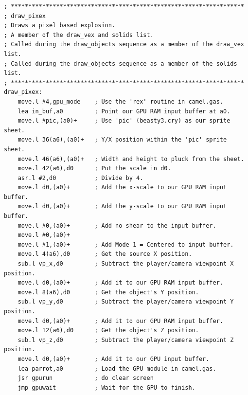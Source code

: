 \begin{lstlisting}
; *******************************************************************
; draw_pixex
; Draws a pixel based explosion.
; A member of the draw_vex and solids list.
; Called during the draw_objects sequence as a member of the draw_vex list.
; Called during the draw_objects sequence as a member of the solids list.
; *******************************************************************
draw_pixex:
    move.l #4,gpu_mode    ; Use the 'rex' routine in camel.gas.
    lea in_buf,a0         ; Point our GPU RAM input buffer at a0.
    move.l #pic,(a0)+     ; Use 'pic' (beasty3.cry) as our sprite sheet.
    move.l 36(a6),(a0)+   ; Y/X position within the 'pic' sprite sheet.
    move.l 46(a6),(a0)+   ; Width and height to pluck from the sheet.
    move.l 42(a6),d0      ; Put the scale in d0.
    asr.l #2,d0           ; Divide by 4.
    move.l d0,(a0)+       ; Add the x-scale to our GPU RAM input buffer.
    move.l d0,(a0)+       ; Add the y-scale to our GPU RAM input buffer.
    move.l #0,(a0)+       ; Add no shear to the input buffer.
    move.l #0,(a0)+
    move.l #1,(a0)+       ; Add Mode 1 = Centered to input buffer.
    move.l 4(a6),d0       ; Get the source X position.
    sub.l vp_x,d0         ; Subtract the player/camera viewpoint X position.
    move.l d0,(a0)+       ; Add it to our GPU RAM input buffer.
    move.l 8(a6),d0       ; Get the object's Y position.
    sub.l vp_y,d0         ; Subtract the player/camera viewpoint Y position.
    move.l d0,(a0)+       ; Add it to our GPU RAM input buffer.
    move.l 12(a6),d0      ; Get the object's Z position.
    sub.l vp_z,d0         ; Subtract the player/camera viewpoint Z position.
    move.l d0,(a0)+       ; Add it to our GPU input buffer.
    lea parrot,a0         ; Load the GPU module in camel.gas.
    jsr gpurun            ; do clear screen
    jmp gpuwait           ; Wait for the GPU to finish.
\end{lstlisting}

